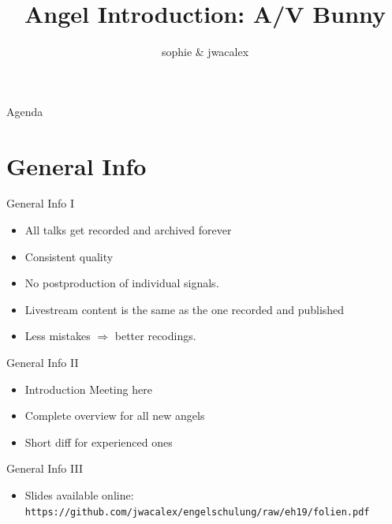 \documentclass[aspectratio=169]{beamer}
\title{Angel Introduction: A/V Bunny}
\author{sophie \& jwacalex}
\institute{C3VOC}
\begin{document}
\maketitle


\begin{frame}{Agenda}
\tableofcontents
\end{frame}


\section{General Info}
\begin{frame}{General Info I}
	\begin{itemize}
		\item All talks get recorded and archived forever
		\item Consistent quality
		\item No postproduction of individual signals.
		\item Livestream content is the same as the one recorded and published
		\item Less mistakes $\Rightarrow$ better recodings.
	\end{itemize}
\end{frame}


\begin{frame}{General Info II}
	\begin{itemize}
		\item Introduction Meeting here
		\item Complete overview for all new angels
		\item Short diff for experienced ones
	\end{itemize}
\end{frame}

\begin{frame}{General Info III}
\begin{itemize}	
		\item Slides available online: \texttt{https://github.com/jwacalex/engelschulung/raw/eh19/folien.pdf}
	\end{itemize}
	\begin{figure} 
		\centering
	\end{figure}
\end{frame}
\end{document}
